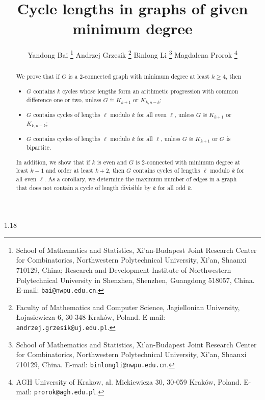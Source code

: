 \documentclass[10pt]{article}
\begin{document}
\begin{spacing}{1.18}

\title{Cycle lengths in graphs of given minimum degree}
\author{Yandong Bai
\thanks{School of Mathematics and Statistics, 
Xi’an-Budapest Joint Research Center for Combinatorics,
Northwestern Polytechnical University,
Xi'an, Shaanxi 710129, China;
Research and Development Institute of 
Northwestern Polytechnical University in Shenzhen,
Shenzhen, Guangdong 518057, China.
E-mail: {\tt bai@nwpu.edu.cn}.}
\quad Andrzej Grzesik
\thanks{Faculty of Mathematics and Computer Science, Jagiellonian University, {\L}ojasiewicza 6, 30-348 Krak\'{o}w, Poland. E-mail: {\tt andrzej.grzesik@uj.edu.pl}.}
\quad Binlong Li
\thanks{School of Mathematics and Statistics, 
Xi’an-Budapest Joint Research Center for Combinatorics,
Northwestern Polytechnical University,
Xi'an, Shaanxi 710129, China.
E-mail: {\tt binlongli@nwpu.edu.cn}.}
\quad Magdalena Prorok
\thanks{AGH University of Krakow, al. Mickiewicza 30, 30-059 Krak\'ow, Poland. 
E-mail: {\tt prorok@agh.edu.pl}.}
}
\date{}

\maketitle

\begin{abstract}
    We prove that if $G$ is a 2-connected graph with minimum degree at least $k\geqslant 4$, then 
    \begin{itemize}   
       \item [(1)] $G$ contains $k$ cycles whose lengths form an arithmetic progression with common difference one or two, unless $G\cong K_{k+1}$ or $K_{k,n-k}$;
       \item [(2)] $G$ contains cycles of lengths $\ell$ modulo $k$ for all even $\ell$, unless $G\cong K_{k+1}$ or $K_{k,n-k}$;
       \item [(3)] $G$ contains cycles of lengths $\ell$ modulo $k$ for all $\ell$, unless $G\cong K_{k+1}$ or $G$ is bipartite.
    \end{itemize}    
    In addition, we show that if $k$ is even and $G$ is 2-connected with minimum degree at least $k-1$ and order at least $k+2$, then $G$ contains cycles of lengths $\ell$ modulo $k$ for all even $\ell$. As a corollary, we determine the maximum number of edges in a graph that does not contain a cycle of length divisible by $k$ for all odd $k$.
\end{abstract}


\end{spacing}
\end{document}
